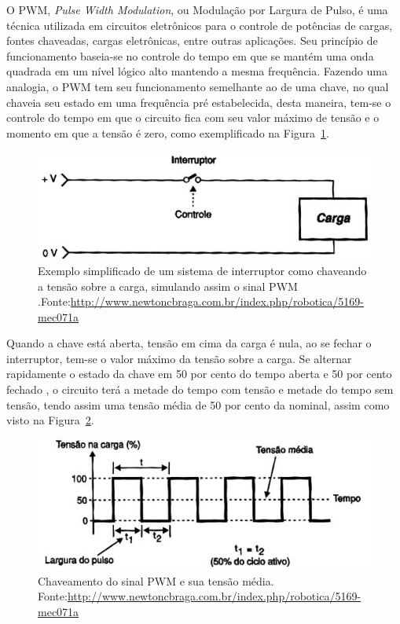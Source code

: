 O PWM, \textit{Pulse Width Modulation}, ou Modulação por Largura de Pulso, é uma técnica utilizada em circuitos eletrônicos para o controle de potências de cargas, fontes chaveadas, cargas eletrônicas, entre outras aplicações. Seu princípio de funcionamento baseia-se no controle do tempo em que se mantém uma onda quadrada em um nível lógico alto mantendo a mesma frequência.
Fazendo uma analogia, o PWM tem seu funcionamento semelhante ao de uma chave, no qual chaveia seu estado em uma frequência pré estabelecida, desta maneira, tem-se o controle do tempo em que o circuito fica com seu valor máximo de tensão e o momento em que a tensão é zero, como exemplificado na Figura~\ref{fig:PWM1}. 

\FloatBarrier
\begin{figure}[!htbp]
	\centering
	\includegraphics[scale=0.7]{imagens/PWM1}
	\caption{Exemplo simplificado de um sistema de interruptor como chaveando a tensão sobre a carga, simulando assim o sinal PWM .Fonte:\url{http://www.newtoncbraga.com.br/index.php/robotica/5169-mec071a} }
	
	\label{fig:PWM1}
\end{figure}
\FloatBarrier

Quando a chave está aberta, tensão em cima da carga é nula, ao se fechar o interruptor, tem-se o valor máximo da tensão sobre a carga. Se alternar rapidamente o estado da chave em 50 por cento do tempo aberta e 50 por cento fechado , o circuito terá a metade do tempo com tensão e metade do tempo sem tensão, tendo assim uma tensão média de 50 por cento da nominal, assim como visto na Figura~\ref{fig:PWM2}.

\FloatBarrier
\begin{figure}[!htbp]
	\centering
	\includegraphics[scale=0.7]{imagens/PWM2}
	\caption{Chaveamento do sinal PWM e sua tensão média. Fonte:\url{http://www.newtoncbraga.com.br/index.php/robotica/5169-mec071a} }%
	
	\label{fig:PWM2}
\end{figure}
\FloatBarrier

